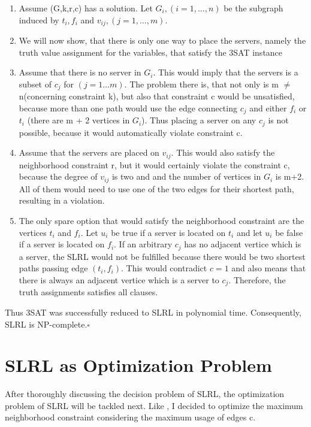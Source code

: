 \documentclass [12pt]{article}
\begin{document}
\begin{enumerate}
  \item{Assume (G,k,r,c) has a solution. Let $G_i, (i=1,\dots,n)$ be the subgraph induced
    by $t_i, f_i$ and $v_{ij},(j=1,\dots,m)$.}
  \item{We will now show, that there is only one way to place the servers, namely the truth
    value assignment for the variables, that satisfy the 3SAT instance}
  \item{Assume that there is no server in $G_i$. This would imply that the servers is a subset of
      $c_j$ for $(j=1\dots m)$. The problem there is, that not only is m $\neq$ n(concerning constraint k),
      but also that constraint c would be unsatisfied, because more than one path would use 
      the edge connecting $c_j$ and either $f_i$ or $t_i$ (there are m + 2 vertices in $G_i$).
    Thus placing a server on any $c_j$ is not possible, because it would automatically violate constraint c.}
  \item{Assume that the servers are placed on $v_{ij}$. This would also satisfy the neighborhood 
      constraint r, but it would certainly violate the constraint c, because the degree of $v_{ij}$ is two and
      and the number of vertices in $G_i$ is m+2. All of them would need to use one of the two edges for their shortest path,
    resulting in a violation.}
  \item{The only spare option that would satisfy the neighborhood constraint 
      are the vertices $t_i$ and $f_i$. Let $u_i$ be true if a server is located on
      $t_i$ and let $u_i$ be false if a server is located on $f_i$.  
      If an arbitrary $c_j$ has no adjacent vertice which is a server,
      the SLRL would not be fulfilled because there would be two shortest paths passing edge
      $(t_i,f_i)$. This would contradict $c = 1$ and also means that there is always an adjacent vertice which is a server to $c_j$.
      Therefore, the truth assignments satisfies all clauses.}
\end{enumerate}
Thus 3SAT was successfully reduced to SLRL in polynomial time.
Consequently, SLRL is NP-complete.$\square$

\section{SLRL as Optimization Problem}

After thoroughly discussing the decision problem of SLRL, the optimization problem
of SLRL will be tackled next. Like \cite{mirrorserver}, I decided to optimize the maximum 
neighborhood constraint considering the maximum usage of edges c.
\end{document}
